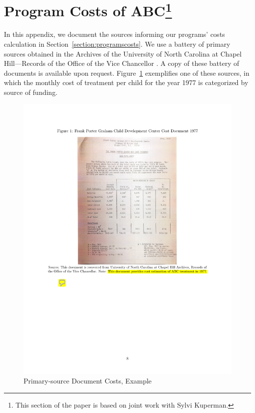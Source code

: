 \section[Program Costs of ABC]{Program Costs of ABC\footnote{This section of the paper is based on joint work with Sylvi Kuperman.}} \label{app:programcosts}

\noindent In this appendix, we document the sources informing our programs' costs calculation in Section~\ref{section:programscosts}. We use a battery of primary sources obtained in the Archives of the University of North Carolina at Chapel Hill---Records of the Office of the Vice Chancellor \citet{UNC-Archives_Health-Affairs}. A copy of these battery of documents is available upon request. Figure~\ref{figure:who} exemplifies one of these sources, in which the monthly cost of treatment per child for the year 1977 is categorized by source of funding.

\begin{center}
\begin{figure}[H] 
\caption{Primary-source Document Costs, Example}
\label{figure:who}
\centering
\includegraphics[width=.9\columnwidth]{AppOutput/Program/UNC-costs.pdf}
\end{figure}
\end{center}

